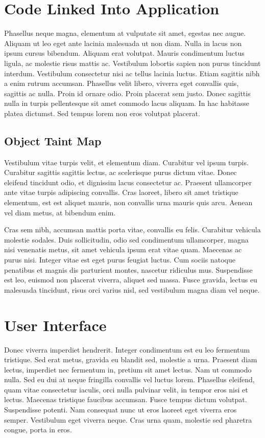 \documentclass[12pt,twoside,notitlepage]{report}
\begin{document}
\section{Code Linked Into Application}

Phasellus neque magna, elementum at vulputate sit amet, egestas nec augue. Aliquam ut leo eget ante lacinia malesuada ut non diam. Nulla in lacus non ipsum cursus bibendum. Aliquam erat volutpat. Mauris condimentum luctus ligula, ac molestie risus mattis ac. Vestibulum lobortis sapien non purus tincidunt interdum. Vestibulum consectetur nisi ac tellus lacinia luctus. Etiam sagittis nibh a enim rutrum accumsan. Phasellus velit libero, viverra eget convallis quis, sagittis ac nulla. Proin id ornare odio. Proin placerat sem justo. Donec sagittis nulla in turpis pellentesque sit amet commodo lacus aliquam. In hac habitasse platea dictumst. Sed tempus lorem non eros volutpat placerat.

\subsection{Object Taint Map}

Vestibulum vitae turpis velit, et elementum diam. Curabitur vel ipsum turpis. Curabitur sagittis sagittis lectus, ac scelerisque purus dictum vitae. Donec eleifend tincidunt odio, et dignissim lacus consectetur ac. Praesent ullamcorper ante vitae turpis adipiscing convallis. Cras laoreet, libero sit amet tristique elementum, est est aliquet mauris, non convallis urna mauris quis arcu. Aenean vel diam metus, at bibendum enim.

Cras sem nibh, accumsan mattis porta vitae, convallis eu felis. Curabitur vehicula molestie sodales. Duis sollicitudin, odio sed condimentum ullamcorper, magna nisi venenatis metus, sit amet vehicula ipsum erat vitae quam. Maecenas ac purus nisi. Integer vitae est eget purus feugiat luctus. Cum sociis natoque penatibus et magnis dis parturient montes, nascetur ridiculus mus. Suspendisse est leo, euismod non placerat viverra, aliquet sed massa. Fusce gravida, lectus eu malesuada tincidunt, risus orci varius nisl, sed vestibulum magna diam vel neque.

\section{User Interface}

Donec viverra imperdiet hendrerit. Integer condimentum est eu leo fermentum tristique. Sed erat metus, gravida eu blandit sed, molestie a urna. Praesent diam lectus, imperdiet nec fermentum in, pretium sit amet lectus. Nam ut commodo nulla. Sed eu dui at neque fringilla convallis vel luctus lorem. Phasellus eleifend, quam vitae consectetur iaculis, orci nulla pulvinar velit, in tempor eros nisi et lectus. Maecenas tristique faucibus accumsan. Fusce tempus dictum volutpat. Suspendisse potenti. Nam consequat nunc ut eros laoreet eget viverra eros semper. Vestibulum eget viverra neque. Cras urna quam, molestie sed pharetra congue, porta in eros.
\end{document}
